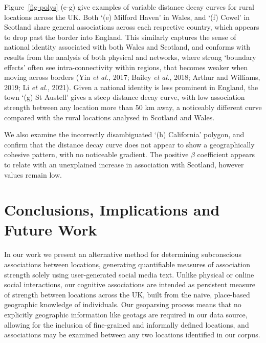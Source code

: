 \documentclass[
  letterpaper,
  11pt,
  english,
  onehalfspacing,
  headsepline]{MastersDoctoralThesis}
\begin{document}
Figure~\ref{fig-polys} (e-g) give examples of variable distance decay
curves for rural locations across the UK. Both `(e) Milford Haven' in
Wales, and `(f) Cowel' in Scotland share general associations across
each respective country, which appears to drop past the border into
England. This similarly captures the sense of national identity
associated with both Wales and Scotland, and conforms with results from
the analysis of both physical and networks, where strong `boundary
effects' often see intra-connectivity within regions, that becomes
weaker when moving across borders (Yin \emph{et al.}, 2017; Bailey
\emph{et al.}, 2018; Arthur and Williams, 2019; Li \emph{et al.}, 2021).
Given a national identity is less prominent in England, the town `(g) St
Austell' gives a steep distance decay curve, with low association
strength between any location more than 50 km away, a noticeably
different curve compared with the rural locations analysed in Scotland
and Wales.

We also examine the incorrectly disambiguated `(h) California' polygon,
and confirm that the distance decay curve does not appear to show a
geographically cohesive pattern, with no noticeable gradient. The
positive \(\beta\) coefficient appears to relate with an unexplained
increase in association with Scotland, however values remain low.

\hypertarget{sec-conclusioncon}{%
\section{Conclusions, Implications and Future
Work}\label{sec-conclusioncon}}

In our work we present an alternative method for determining
subconscious associations between locations, generating quantifiable
measures of association strength solely using user-generated social
media text. Unlike physical or online social interactions, our cognitive
associations are intended as persistent measure of strength between
locations across the UK, built from the naive, place-based geographic
knowledge of individuals. Our geoparsing process means that no
explicitly geographic information like geotags are required in our data
source, allowing for the inclusion of fine-grained and informally
defined locations, and associations may be examined between any two
locations identified in our corpus.
\end{document}
